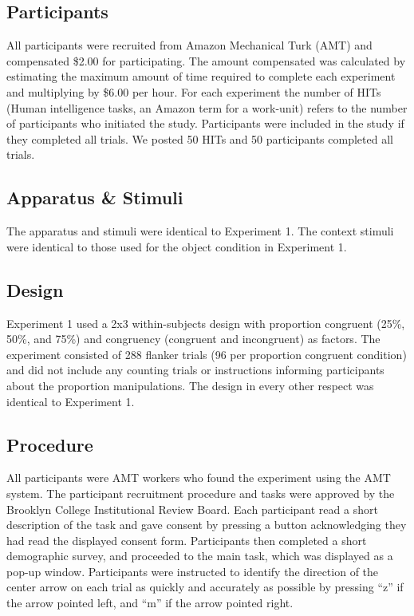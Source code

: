 \documentclass[english,,man,floatsintext]{apa6}
\begin{document}
\hypertarget{participants-1}{%
\subsection{Participants}\label{participants-1}}

All participants were recruited from Amazon Mechanical Turk (AMT) and compensated \$2.00 for participating. The amount compensated was calculated by estimating the maximum amount of time required to complete each experiment and multiplying by \$6.00 per hour. For each experiment the number of HITs (Human intelligence tasks, an Amazon term for a work-unit) refers to the number of participants who initiated the study. Participants were included in the study if they completed all trials. We posted 50 HITs and 50 participants completed all trials.

\hypertarget{apparatus-stimuli-1}{%
\subsection{Apparatus \& Stimuli}\label{apparatus-stimuli-1}}

The apparatus and stimuli were identical to Experiment 1. The context stimuli were identical to those used for the object condition in Experiment 1.

\hypertarget{design-1}{%
\subsection{Design}\label{design-1}}

Experiment 1 used a 2x3 within-subjects design with proportion congruent (25\%, 50\%, and 75\%) and congruency (congruent and incongruent) as factors. The experiment consisted of 288 flanker trials (96 per proportion congruent condition) and did not include any counting trials or instructions informing participants about the proportion manipulations. The design in every other respect was identical to Experiment 1.

\hypertarget{procedure-1}{%
\subsection{Procedure}\label{procedure-1}}

All participants were AMT workers who found the experiment using the AMT system. The participant recruitment procedure and tasks were approved by the Brooklyn College Institutional Review Board. Each participant read a short description of the task and gave consent by pressing a button acknowledging they had read the displayed consent form. Participants then completed a short demographic survey, and proceeded to the main task, which was displayed as a pop-up window. Participants were instructed to identify the direction of the center arrow on each trial as quickly and accurately as possible by pressing \enquote{z} if the arrow pointed left, and \enquote{m} if the arrow pointed right.
\end{document}
